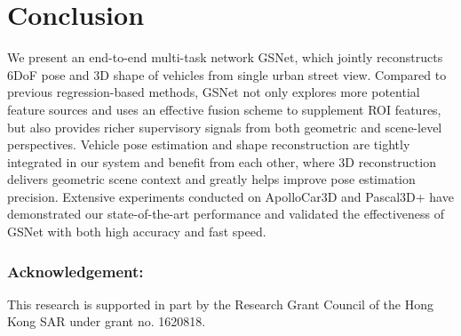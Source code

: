 \documentclass[runningheads]{llncs}
\begin{document}
\section{Conclusion}
We present an end-to-end multi-task network GSNet, which jointly reconstructs 6DoF pose and 3D shape of vehicles from single urban street view.
Compared to previous regression-based methods, GSNet not only explores more potential feature sources and uses an effective fusion scheme to supplement ROI features, but also provides richer supervisory signals from both geometric and scene-level perspectives.
Vehicle pose estimation and shape reconstruction are tightly integrated in our system and benefit from each other, where 3D reconstruction delivers geometric scene context and greatly helps improve pose estimation precision.
Extensive experiments conducted on ApolloCar3D and Pascal3D+ have demonstrated our state-of-the-art performance and validated the effectiveness of GSNet with both high accuracy and fast speed.
\subsubsection{Acknowledgement:}This research is supported in part by the Research Grant Council of the Hong Kong SAR under grant no. 1620818. 
\clearpage


\end{document}
